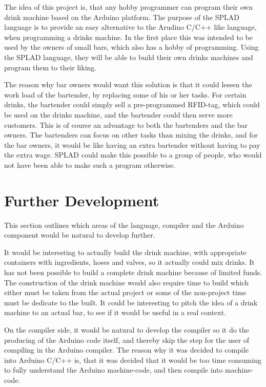 \label{chap:perspektivering}
The idea of this project is, that any hobby programmer can program their own drink machine based on the Arduino platform. The purpose of the SPLAD language is to provide an easy alternative to the Arudino C/C++ like language, when programming a drinks machine. In the first place this was intended to be used by the owners of small bars, which also has a hobby of programming. Using the SPLAD language, they will be able to build their own drinks machines and program them to their liking.

The reason why bar owners would want this solution is that it could lessen the work load of the bartender, by replacing some of his or her tasks. For certain drinks, the bartender could simply sell a pre-programmed RFID-tag, which could be used on the drinks machine, and the bartender could then serve more customers. This is of course an advantage to both the bartenders and the bar owners. The bartenders can focus on other tasks than mixing the drinks, and for the bar owners, it would be like having an extra bartender without having to pay the extra wage. SPLAD could make this possible to a group of people, who would not have been able to make such a program otherwise.

\section{Further Development}
This section outlines which areas of the language, compiler and the Arduino component would be natural to develop further.

It would be interesting to actually build the drink machine, with appropriate containers with ingredients, hoses and valves, so it actually could mix drinks. It has not been possible to build a complete drink machine because of limited funds. The construction of the drink machine would also require time to build which either must be taken from the actual project or some of the non-project time must be dedicate to the built. It could be interesting to pitch the idea of a drink machine to an actual bar, to see if it would be useful in a real context.

On the compiler side, it would be natural to develop the compiler so it do the producing of the Arduino code itself, and thereby skip the step for the user of compiling in the Arduino compiler. The reason why it was decided to compile into Arduino C/C++ is, that it was decided that it would be too time consuming to fully understand the Arduino machine-code, and then compile into machine-code.

